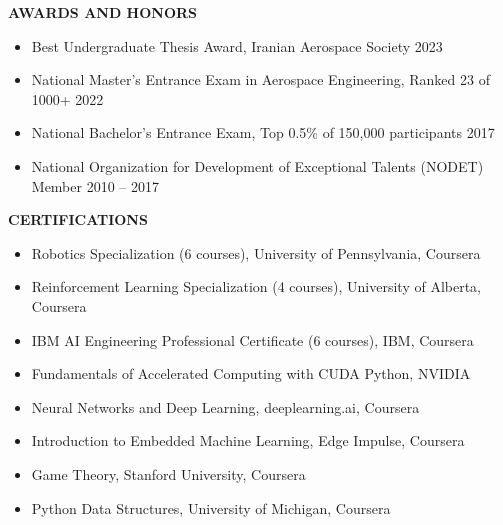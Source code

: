 \documentclass[12pt]{article}
\begin{document}
\vspace{8pt}

\begin{center}
	{\noindent \bfseries AWARDS AND HONORS}
\end{center}

\vspace{-4pt}

\begin{itemize} \itemsep -1pt
	\item Best Undergraduate Thesis Award, Iranian Aerospace Society \hfill 2023
	\item National Master's Entrance Exam in Aerospace Engineering, Ranked 23 of 1000+ \hfill 2022
	\item National Bachelor's Entrance Exam, Top 0.5\% of 150,000 participants \hfill 2017
	\item National Organization for Development of Exceptional Talents (NODET) Member \hfill 2010 -- 2017
\end{itemize}

\vspace{8pt}

\begin{center}
	{\noindent \bfseries CERTIFICATIONS}
\end{center}

\vspace{-4pt}

\begin{itemize} \itemsep -2pt
	\item Robotics Specialization (6 courses), University of Pennsylvania, Coursera
	\item Reinforcement Learning Specialization (4 courses), University of Alberta, Coursera
	\item IBM AI Engineering Professional Certificate (6 courses), IBM, Coursera
	\item Fundamentals of Accelerated Computing with CUDA Python, NVIDIA
	\item Neural Networks and Deep Learning, deeplearning.ai, Coursera
	\item Introduction to Embedded Machine Learning, Edge Impulse, Coursera
	\item Game Theory, Stanford University, Coursera
	\item Python Data Structures, University of Michigan, Coursera
\end{itemize}
\end{document}
